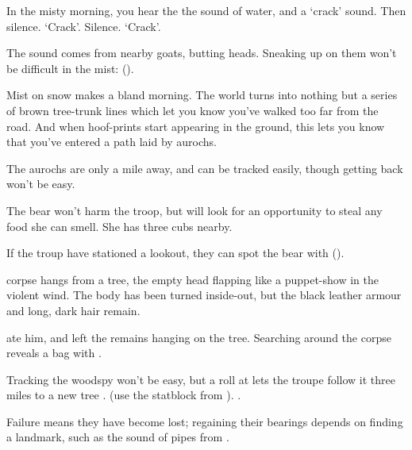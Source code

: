 
\ifcase\value{cycle}

\begin{boxtext}
  In the misty morning, you hear the the sound of water, and a `crack' sound.
  Then silence.
  `Crack'.
  Silence.
  `Crack'.
\end{boxtext}

The sound comes from nearby goats, butting heads.
Sneaking up on them won't be difficult in the mist:  (\tn[9]).

\or

\begin{boxtext}
  Mist on snow makes a bland morning.
  The world turns into nothing but a series of brown tree-trunk lines which let you know you've walked too far from the road.
  And when hoof-prints start appearing in the ground, this lets you know that you've entered a path laid by aurochs.
\end{boxtext}

The aurochs are only a mile away, and can be tracked easily, though getting back won't be easy.


\or

The bear won't harm the troop, but will look for an opportunity to steal any food she can smell.
She has three cubs nearby.

\setcounter{tn}{\value{Dexterity}}
\addtocounter{tn}{\value{Stealth}}

If the troup have stationed a lookout, they can spot the bear with  (\tn).

\bear

\else

\begin{boxtext}
   corpse hangs from a tree, the empty head flapping like a puppet-show in the violent wind.
  The body has been turned inside-out, but the black leather armour and long, dark hair remain.
\end{boxtext}

 ate him, and left the remains hanging on the tree.
Searching around the corpse reveals a bag with \lootSmall.

Tracking the \gls{woodspy} won't  be easy, but a  roll at \tn[10] lets the troupe follow it three miles to a new tree%
%
  {%
      {.}%
      {(use the statblock from ).}%
  }{.
    \woodspy
  }

Failure means they have become lost; regaining their bearings depends on finding a landmark, such as the sound of pipes from .

\fi
